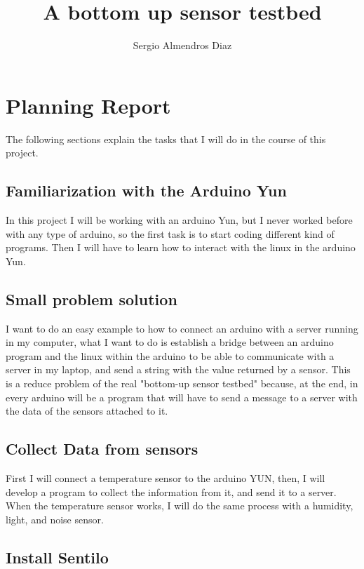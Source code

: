 \documentclass[12pt, b5paper,twoside]{tesi_upf}
\title{A bottom up sensor testbed}
\author{Sergio Almendros Diaz}
\begin{document}
\frontmatter

\maketitle

\cleardoublepage

\section{Planning Report}

The following sections explain the tasks that I will do in the course of this project.

\subsection{Familiarization with the Arduino Yun}

In this project I will be working with an arduino Yun, but I never worked before with any type of arduino, so the first task is to start coding different kind of programs. Then I will have to learn how to interact with the linux in the arduino Yun.

\subsection{Small problem solution}

I want to do an easy example to how to connect an arduino with a server running in my computer, what I want to do is establish a bridge between an arduino program and the linux within the arduino to be able to communicate with a server in my laptop, and send a string with the value returned by a sensor.
This is a reduce problem of the real "bottom-up sensor testbed" because, at the end, in every arduino will be a program that will have to send a message to a server with the data of the sensors attached to it.

\subsection{Collect Data from sensors}

First I will connect a temperature sensor to the arduino YUN, then, I will develop a program to collect the information from it, and send it to a server.
When the temperature sensor works, I will do the same process with a humidity, light, and noise sensor.

\subsection{Install Sentilo}
\end{document}
